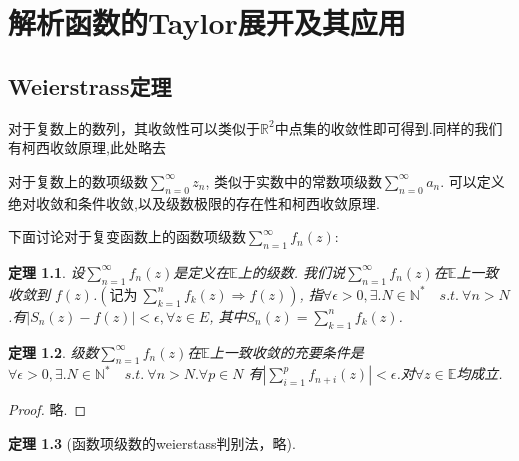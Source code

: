 \documentclass[b5paper,decoration]{qyxf-book}%
\newtheorem{mypro}{定理}[section]%
\begin{document}
\chapter{解析函数的{\rm Taylor}展开及其应用}
\section{Weierstrass定理}
    对于复数上的数列，其收敛性可以类似于$\mathbb{R}^2$中点集的收敛性即可得到.同样的我们有柯西收敛原理,此处略去\par
    对于复数上的数项级数$\displaystyle{\sum\limits_{n=0}^\infty z_n}$, 
    类似于实数中的常数项级数$\displaystyle{\sum\limits_{n=0}^\infty a_n}$.
    可以定义绝对收敛和条件收敛,以及级数极限的存在性和柯西收敛原理.\par
    下面讨论对于复变函数上的函数项级数$\displaystyle{\sum\limits_{n=1}^\infty f_n(z)}$:

\begin{mypro}
    设$\displaystyle{\sum\limits_{n=1}^\infty f_n(z)}$是定义在$\mathbb{E}$上的级数.
    我们说$\displaystyle{\sum\limits_{n=1}^\infty f_n(z)}$在$\mathbb{E}$上一致收敛到
    $f(z)$.$(\mbox{记为}\ \displaystyle{\sum\limits_{k=1}^n f_k(z)\Rightarrow f(z)})$,
    指$\forall\epsilon>0,\exists.N\in \mathbb{N}^*\quad s.t.\ \forall n>N$.有$\left|S_n(z)-f(z)\right|<\epsilon, \forall z\in E$,
    其中$\displaystyle{S_n(z)=\sum\limits_{k=1}^n f_k(z)}$.
\end{mypro}

\begin{mypro}
    级数$\displaystyle{\sum\limits_{n=1}^\infty f_n(z)}$在$\mathbb{E}$上一致收敛的充要条件是
    $\forall\epsilon>0,\exists.N\in \mathbb{N}^*\quad s.t.\ \forall n>N.\forall p\in N$
    有$\displaystyle{\left|\sum\limits_{i=1}^pf_{n+i}(z)\right|<\epsilon}$.对$\forall z\in\mathbb{E}$均成立.
\end{mypro}
\begin{proof}
    略.
\end{proof}

\begin{mypro}[函数项级数的weierstass判别法，略]
\end{mypro}
\end{document}
